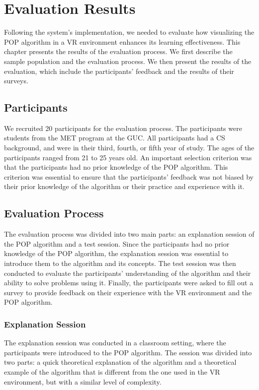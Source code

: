 \chapter{Evaluation Results}

Following the system's implementation, we needed to evaluate how visualizing the \acl{POP} algorithm in a \ac{VR} environment enhances its learning effectiveness. This chapter presents the results of the evaluation process. We first describe the sample population and the evaluation process. We then present the results of the evaluation, which include the participants' feedback and the results of their surveys.

\section{Participants}

We recruited 20 participants for the evaluation process. The participants were students from the \acf{MET} program at the \acf{GUC}. All participants had a \ac{CS} background, and were in their third, fourth, or fifth year of study. The ages of the participants ranged from 21 to 25 years old. An important selection criterion was that the participants had no prior knowledge of the \acf{POP} algorithm. This criterion was essential to ensure that the participants' feedback was not biased by their prior knowledge of the algorithm or their practice and experience with it.

\section{Evaluation Process}

The evaluation process was divided into two main parts: an explanation session of the \ac{POP} algorithm and a test session. Since the participants had no prior knowledge of the \ac{POP} algorithm, the explanation session was essential to introduce them to the algorithm and its concepts. The test session was then conducted to evaluate the participants' understanding of the algorithm and their ability to solve problems using it. Finally, the participants were asked to fill out a survey to provide feedback on their experience with the \ac{VR} environment and the \ac{POP} algorithm.

\subsection{Explanation Session}
The explanation session was conducted in a classroom setting, where the participants were introduced to the \ac{POP} algorithm. The session was divided into two parts: a quick theoretical explanation of the algorithm and a theoretical example of the algorithm that is different from the one used in the \ac{VR} environment, but with a similar level of complexity.


